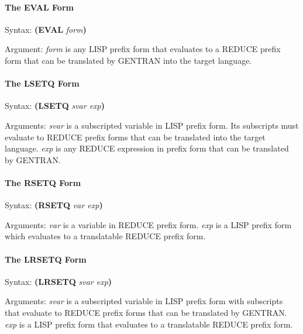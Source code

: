 \paragraph{The EVAL Form}
\label{sym:eval}
\begin{describe}{Syntax:} 
{\bf (EVAL} {\it form\/}{\bf )}
\end{describe} 
\begin{describe}{Argument:}
{\it form\/} is any LISP prefix form that evaluates to a REDUCE prefix form
that can be translated by GENTRAN into the target language.
\end{describe} 

\paragraph{The LSETQ Form} 
\begin{describe}{Syntax:}
{\bf (LSETQ} {\it svar exp\/}{\bf )}
\end{describe} 
\begin{describe}{Arguments:}
{\it svar\/} is a subscripted variable in LISP prefix form.  Its subscripts
must evaluate to REDUCE prefix forms that can be translated
into the target language.  {\it exp\/} is any REDUCE expression in
prefix form that can be translated by GENTRAN.
\end{describe} 

\paragraph{The RSETQ Form} 
\begin{describe}{Syntax:}
{\bf (RSETQ} {\it var exp\/}{\bf )}
\end{describe}
\begin{describe}{Arguments:}
{\it var\/} is a variable in REDUCE prefix form.  {\it exp\/} is a LISP
prefix form which evaluates to a translatable REDUCE prefix form.
\end{describe} 

\paragraph{The LRSETQ Form} 
\label{sym:lrsetq}
\begin{describe}{Syntax:}
{\bf (LRSETQ} {\it svar exp\/}{\bf )}
\end{describe} 
\begin{describe}{Arguments:}
{\it svar\/} is a subscripted variable in LISP prefix form with
subscripts that evaluate to REDUCE prefix forms
that can be translated by GENTRAN.  {\it exp\/} is a LISP prefix
form that evaluates to a translatable REDUCE prefix form.
\end{describe}

